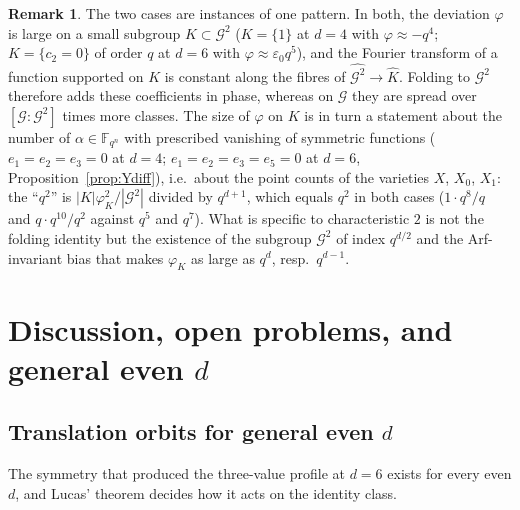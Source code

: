 \documentclass[11pt,a4paper]{amsart}
\theoremstyle{definition}
\newtheorem{remark}[theorem]{Remark}
\newcommand{\F}{\mathbb{F}}
\newcommand{\G}{\mathcal{G}}
\newcommand{\sgn}{\varepsilon_0}
\begin{document}
\begin{remark}
The two cases are instances of one pattern. In both, the deviation $\varphi$ is large on a small subgroup $K\subset\G^2$ ($K=\{1\}$ at $d=4$ with $\varphi\approx-q^4$; $K=\{c_2=0\}$ of order $q$ at $d=6$ with $\varphi\approx\sgn q^5$), and the Fourier transform of a function supported on $K$ is constant along the fibres of $\widehat{\G^2}\to\widehat K$. Folding to $\G^2$ therefore adds these coefficients in phase, whereas on $\G$ they are spread over $[\G:\G^2]$ times more classes. The size of $\varphi$ on $K$ is in turn a statement about the number of $\alpha\in\F_{q^n}$ with prescribed vanishing of symmetric functions ($e_1=e_2=e_3=0$ at $d=4$; $e_1=e_2=e_3=e_5=0$ at $d=6$, Proposition~\ref{prop:Ydiff}), i.e.\ about the point counts of the varieties $X$, $X_0$, $X_1$: the ``$q^2$'' is $|K|\varphi_K^2/|\G^2|$ divided by $q^{d+1}$, which equals $q^2$ in both cases ($1\cdot q^8/q$ and $q\cdot q^{10}/q^2$ against $q^5$ and $q^7$). What is specific to characteristic $2$ is not the folding identity but the existence of the subgroup $\G^2$ of index $q^{d/2}$ and the Arf-invariant bias that makes $\varphi_K$ as large as $q^{d}$, resp.\ $q^{d-1}$.
\end{remark}

\newpage
\section{Discussion, open problems, and general even \texorpdfstring{$d$}{d}}\label{sec:discussion}

\subsection{Translation orbits for general even \texorpdfstring{$d$}{d}}
The symmetry that produced the three-value profile at $d=6$ exists for every even $d$, and Lucas' theorem decides how it acts on the identity class.
\end{document}
